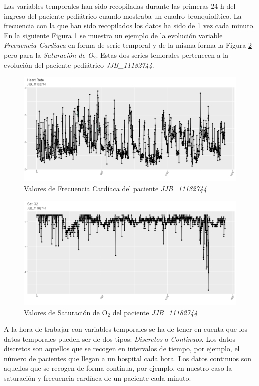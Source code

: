 Las variables temporales han sido recopiladas durante las primeras 24 h del ingreso del paciente pediátrico cuando mostraba un cuadro bronquiolítico. La frecuencia con la que han sido recopilados los datos ha sido de 1 vez cada minuto. En la siguiente Figura \ref{fig:fc-JJB} se muestra un ejemplo de la evolución  variable \textit{Frecuencia Cardiaca} en forma de serie temporal y de la misma forma la Figura \ref{fig:satO2-JJB} pero para la \textit{Saturación de O$_2$}. Estas dos series temorales pertenecen a la evolución del paciente pediátrico \textit{JJB\_11182744}.

\begin{figure}[H]
    \centering
    \includegraphics[scale=0.70]{./img/Heart-Rate-JJB.png}
    \caption{Valores de Frecuencia Cardíaca del paciente \textit{JJB\_11182744}}
    \label{fig:fc-JJB}
\end{figure}

\begin{figure}[H]
    \centering
    \includegraphics[scale=0.70]{./img/SatO2-JJB.png}
    \caption{Valores de Saturación de O$_2$ del paciente \textit{JJB\_11182744}}
    \label{fig:satO2-JJB}
\end{figure}

A la hora de trabajar con variables temporales se ha de tener en cuenta que los datos temporales pueden ser de dos tipos: \textit{Discretos} o \textit{Continuos}. Los datos discretos son aquellos que se recogen en intervalos de tiempo, por ejemplo, el número de pacientes que llegan a un hospital cada hora. Los datos continuos son aquellos que se recogen de forma continua, por ejemplo, en nuestro caso la saturación y frecuencia cardíaca de un paciente cada minuto.

